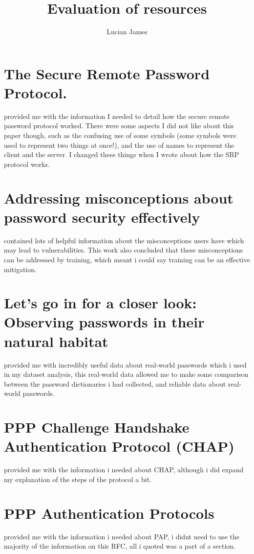 \documentclass[11pt]{article}
\title{Evaluation of resources}
\author{Lucian James}
\begin{document}
\maketitle

\section{The Secure Remote Password Protocol.}
\cite{wu1998secure} provided me with the information I needed to detail how the secure remote password protocol worked. There were some aspects I did not like about this paper though, such as the confusing use of some symbols (some symbols were used to represent two things at once!), and the use of names to represent the client and the server. I changed these things when I wrote about how the SRP protocol works.



\section{Addressing misconceptions about password security effectively}
\cite{mayer2018addressing} contained lots of helpful information about the misconceptions users have which may lead to vulnerabilities. This work also concluded that these misconceptions can be addressed by training, which meant i could say training can be an effective mitigation.



\section{Let's go in for a closer look: Observing passwords in their natural habitat}
\cite{pearman2017let} provided me with incredibly useful data about real-world passwords which i used in my dataset analysis, this real-world data allowed me to make some comparison between the password dictionaries i had collected, and reliable data about real-world passwords.



\section{PPP Challenge Handshake Authentication Protocol (CHAP)}
\cite{simpson1996chap} provided me with the information i needed about CHAP, although i did expand my explanation of the steps of the protocol a bit.



\section{PPP Authentication Protocols}
\cite{simpson1992pap} provided me with the information i needed about PAP, i didnt need to use the majority of the information on this RFC, all i quoted was a part of a section.
\end{document}
